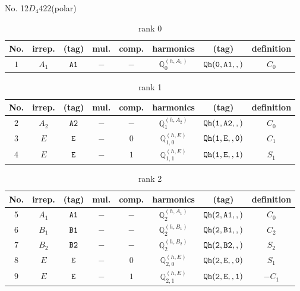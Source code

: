 \documentclass[fleqn,8pt]{jsarticle}
\begin{document}
\setcounter{MaxMatrixCols}{16}

\begin{center}
\LARGE
No. 12\quad$D_{4}$\quad$422$\quad[ tetragonal ] (polar)
\end{center}
\begin{table}[ht!]
\begin{center}
\caption{rank 0}
\renewcommand{\arraystretch}{1.3}
\begin{tabular}{cccccccc} \hline \hline
No. & irrep. & (tag) & mul. & comp. & harmonics & (tag) & definition \\ \hline
$ 1 $ & $ A_{1} $ & $ {\tt A1} $ & $ - $ & $ - $ & $ \mathbb{Q}_{0}^{(h,A_{1})} $ & $ {\tt Qh(0,A1,,)} $ & $ C_{0} $ \\
 \hline \hline
\end{tabular}
\end{center}
\end{table}
\begin{table}[ht!]
\begin{center}
\caption{rank 1}
\renewcommand{\arraystretch}{1.3}
\begin{tabular}{cccccccc} \hline \hline
No. & irrep. & (tag) & mul. & comp. & harmonics & (tag) & definition \\ \hline
$ 2 $ & $ A_{2} $ & $ {\tt A2} $ & $ - $ & $ - $ & $ \mathbb{Q}_{1}^{(h,A_{2})} $ & $ {\tt Qh(1,A2,,)} $ & $ C_{0} $ \\
$ 3 $ & $ E $ & $ {\tt E} $ & $ - $ & $ 0 $ & $ \mathbb{Q}_{1,0}^{(h,E)} $ & $ {\tt Qh(1,E,,0)} $ & $ C_{1} $ \\
$ 4 $ & $ E $ & $ {\tt E} $ & $ - $ & $ 1 $ & $ \mathbb{Q}_{1,1}^{(h,E)} $ & $ {\tt Qh(1,E,,1)} $ & $ S_{1} $ \\
 \hline \hline
\end{tabular}
\end{center}
\end{table}
\begin{table}[ht!]
\begin{center}
\caption{rank 2}
\renewcommand{\arraystretch}{1.3}
\begin{tabular}{cccccccc} \hline \hline
No. & irrep. & (tag) & mul. & comp. & harmonics & (tag) & definition \\ \hline
$ 5 $ & $ A_{1} $ & $ {\tt A1} $ & $ - $ & $ - $ & $ \mathbb{Q}_{2}^{(h,A_{1})} $ & $ {\tt Qh(2,A1,,)} $ & $ C_{0} $ \\
$ 6 $ & $ B_{1} $ & $ {\tt B1} $ & $ - $ & $ - $ & $ \mathbb{Q}_{2}^{(h,B_{1})} $ & $ {\tt Qh(2,B1,,)} $ & $ C_{2} $ \\
$ 7 $ & $ B_{2} $ & $ {\tt B2} $ & $ - $ & $ - $ & $ \mathbb{Q}_{2}^{(h,B_{2})} $ & $ {\tt Qh(2,B2,,)} $ & $ S_{2} $ \\
$ 8 $ & $ E $ & $ {\tt E} $ & $ - $ & $ 0 $ & $ \mathbb{Q}_{2,0}^{(h,E)} $ & $ {\tt Qh(2,E,,0)} $ & $ S_{1} $ \\
$ 9 $ & $ E $ & $ {\tt E} $ & $ - $ & $ 1 $ & $ \mathbb{Q}_{2,1}^{(h,E)} $ & $ {\tt Qh(2,E,,1)} $ & $ - C_{1} $ \\
 \hline \hline
\end{tabular}
\end{center}
\end{table}
\end{document}
